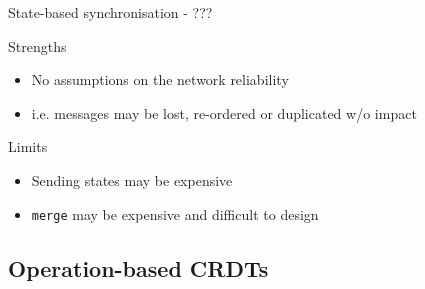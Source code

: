 \begin{frame}{State-based synchronisation - ???}

    \begin{block}{Strengths}
        \begin{itemize}
            \item No assumptions on the network reliability
            \item i.e. messages may be lost, re-ordered or duplicated w/o impact
        \end{itemize}
    \end{block}
    \begin{block}{Limits}
        \begin{itemize}
            \item Sending states may be expensive
            \item \texttt{merge} may be expensive and difficult to design
        \end{itemize}
    \end{block}
\end{frame}

\subsection{Operation-based CRDTs}

